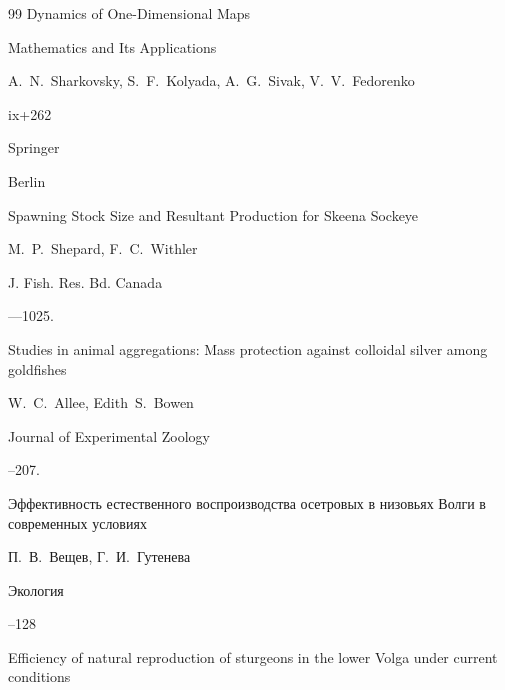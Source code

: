 \begin{thebibliography}{99}
\book Dynamics of One-Dimensional Maps

\serial Mathematics and Its Applications


\by A.~N.~Sharkovsky, S.~F.~Kolyada, A.~G.~Sivak, V.~V.~Fedorenko


\totalpages ix+262

\publ Springer

\publaddr Berlin






\paper Spawning Stock Size and Resultant Production for Skeena Sockeye

\by M.~P.~Shepard, F.~C.~Withler

\jour J. Fish. Res. Bd. Canada




—1025.





\paper Studies in animal aggregations: Mass protection against colloidal silver among goldfishes

\by W.~C.~Allee, Edith~S.~Bowen

\jour Journal of Experimental Zoology




--207.





\paper Эффективность естественного воспроизводства осетровых в низовьях Волги в современных условиях

\by П.~В.~Вещев, Г.~И.~Гутенева

\jour Экология



--128


\transl

\paper Efficiency of natural reproduction of sturgeons in the lower Volga under current conditions


\end{thebibliography}
